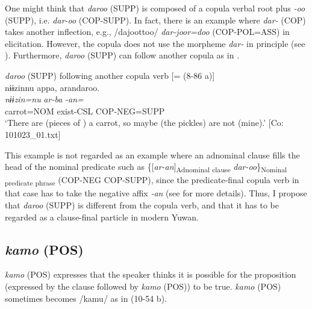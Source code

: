   One might think that \textit{daroo} (SUPP) is composed of a copula verbal root plus \textit{{}-oo} (SUPP), i.e. \textit{dar-oo} (COP-SUPP). In fact, there is an example where \textit{dar-} (COP) takes another inflection, e.g., /dajoottoo/ \textit{dar-joor=doo} (COP-POL=ASS) in elicitation. However, the copula does not use the morpheme \textit{dar-} in principle (see ). Furthermore, \textit{daroo} (SUPP) can follow another copula as in .

\ea\label{ex:10.53}   \textit{daroo} (SUPP) following another copula verb [= (8-86 a)]\\
      \glll    nɨɨzinnu  appa,  arandaroo.\\
    \textit{nɨɨzin=nu}  \textit{ar-ba}  \textit{-an=}\\
    carrot=NOM  exist-CSL  COP-NEG=SUPP\\
\glt     ‘There are (pieces of ) a carrot, so maybe (the pickles) are not (mine).’  [Co: 101023\_01.txt]
\z

This example is not regarded as an example where an adnominal clause fills the head of the nominal predicate such as \{[\textit{ar-an}]\textsubscript{Adnominal clause} \textit{dar-oo}\}\textsubscript{Nominal predicate phrase} (COP-NEG COP-SUPP), since the predicate-final copula verb in that case has to take the negative affix \textit{-an} (see  for more details). Thus, I propose that \textit{daroo} (SUPP) is different from the copula verb, and that it has to be regarded as a clause-final particle in modern Yuwan.

\subsection{\textit{kamo} (POS)}\label{sec:10.3.8}

\textit{kamo} (POS) expresses that the speaker thinks it is possible for the proposition (expressed by the clause followed by \textit{kamo} (POS)) to be true. \textit{kamo} (POS) sometimes becomes /kamu/ as in (10-54 b).

